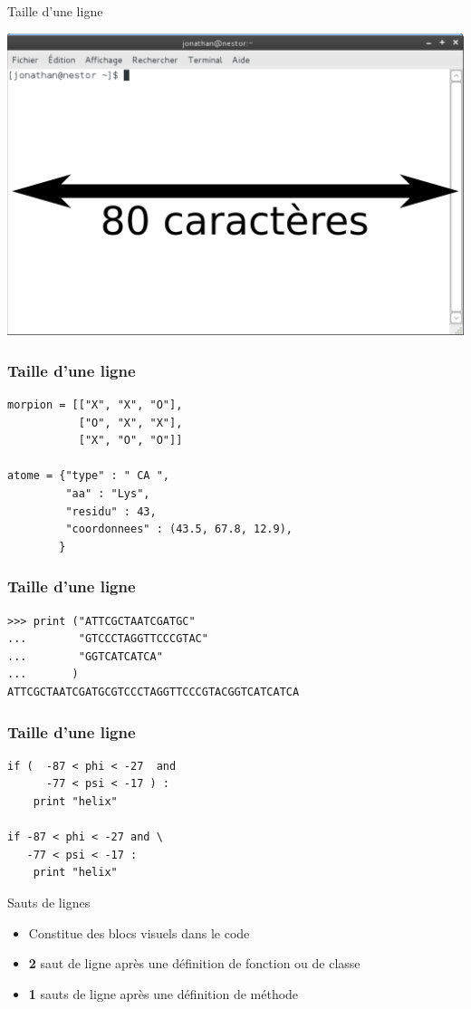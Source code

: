 \documentclass[xcolor=pdftex,dvipsnames,table,handout]{beamer}
\begin{document}
\begin{frame}{Taille d'une ligne}
\begin{center}
\includegraphics[width=0.7\linewidth]{img/Capture-Terminal.pdf}
\end{center}
\end{frame}

\begin{frame}[fragile]
\frametitle{Taille d'une ligne}
\begin{lstlisting}
morpion = [["X", "X", "O"],
           ["O", "X", "X"],
           ["X", "O", "O"]]

atome = {"type" : " CA ",
         "aa" : "Lys",
         "residu" : 43,
         "coordonnees" : (43.5, 67.8, 12.9),
        }
\end{lstlisting}
\end{frame}

\begin{frame}[fragile]
\frametitle{Taille d'une ligne}
\begin{lstlisting}
>>> print ("ATTCGCTAATCGATGC"
...        "GTCCCTAGGTTCCCGTAC"
...        "GGTCATCATCA"
...       )
ATTCGCTAATCGATGCGTCCCTAGGTTCCCGTACGGTCATCATCA
\end{lstlisting}
\end{frame}

\begin{frame}[fragile]
\frametitle{Taille d'une ligne}
\begin{lstlisting}
if (  -87 < phi < -27  and 
      -77 < psi < -17 ) :
    print "helix"

if -87 < phi < -27 and \
   -77 < psi < -17 :
    print "helix"
\end{lstlisting}
\end{frame}

\begin{frame}{Sauts de lignes}
\begin{itemize}
    \item Constitue des blocs visuels dans le code
    \item \textbf{2} saut de ligne après une définition de fonction ou de classe
    \item \textbf{1} sauts de ligne après une définition de méthode
\end{itemize}
\end{frame}
\end{document}
